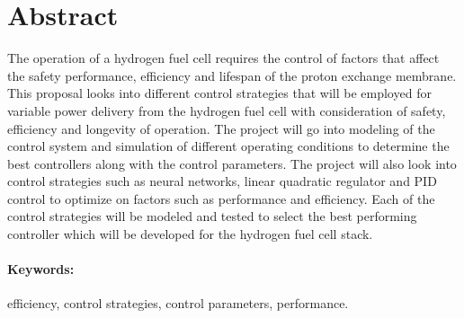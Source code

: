 \section*{Abstract}
\label{sec:}
The operation of a hydrogen fuel cell requires the control of factors that affect the safety performance, efficiency and lifespan of the proton exchange membrane. This proposal  looks into different control strategies that will be employed for variable power delivery from the hydrogen fuel cell with consideration of safety, efficiency and longevity of operation.
The project will go into modeling of the control system and simulation of different operating conditions to determine the best controllers along with the control parameters. The project will also look into control strategies such as neural networks, linear quadratic regulator and PID control to optimize on factors such as performance and efficiency. Each of the control strategies will be modeled and tested to select the best performing controller which will be developed for the hydrogen fuel cell stack.

\paragraph{\textbf{Keywords:}} efficiency, control strategies, control parameters, performance.




